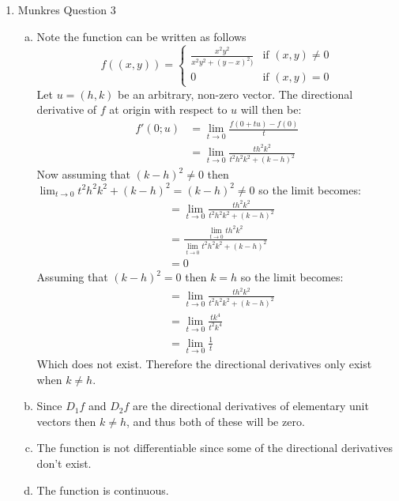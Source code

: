 \documentclass[letterpaper,10pt]{article}
\begin{document}
\begin{enumerate}
	\item Munkres Question 3
	\begin{enumerate}[a)]
		\item Note the function can be written as follows
		\[
		 f((x,y)) =
		  \begin{cases}
		   \frac{x^2y^2}{x^2y^2 + (y-x)^2)} & \text{if } (x, y) \neq 0 \\
		   0       & \text{if } (x, y) = 0
		  \end{cases}
		\]
		Let $u = (h, k)$ be an arbitrary, non-zero vector. The directional derivative of $f$ at origin with respect to $u$ will then be:
		\begin{align*}
			f'(0; u) & =  \lim_{t \to 0} \frac{f(0 + tu) - f(0)}{t} \\
			& =  \lim_{t \to 0} \frac{t h^2k^2}{t^2h^2k^2 + (k - h)^2}
		\end{align*}
		Now assuming that $(k - h)^2 \neq 0$ then $\lim_{t\to 0} t^2h^2k^2 + (k - h)^2 = (k - h)^2 \neq 0$ so the limit becomes:
		\begin{align*}
			& =  \lim_{t \to 0} \frac{t h^2k^2}{t^2h^2k^2 + (k - h)^2} \\
			& =  \frac{\lim_{t \to 0} t h^2k^2}{\lim_{t \to 0} t^2h^2k^2 + (k - h)^2} \\
			& =  0
		\end{align*}
		Assuming that $(k - h)^2 = 0$ then $k = h$ so the limit becomes:
		\begin{align*}
			& =  \lim_{t \to 0} \frac{t h^2k^2}{t^2h^2k^2 + (k - h)^2} \\
			& =  \lim_{t \to 0} \frac{t k^4}{t^2k^4} \\
			& =  \lim_{t \to 0} \frac{1}{t}
		\end{align*}
		Which does not exist. Therefore the directional derivatives only exist when $k \neq h$. 
		\item Since $D_1 f$ and $D_2 f$ are the directional derivatives of elementary unit vectors then $k \neq h$, and thus both of these will be zero.
		\item The function is not differentiable since some of the directional derivatives don't exist.
		\item The function is continuous.
	\end{enumerate}


\end{enumerate}
\end{document}
